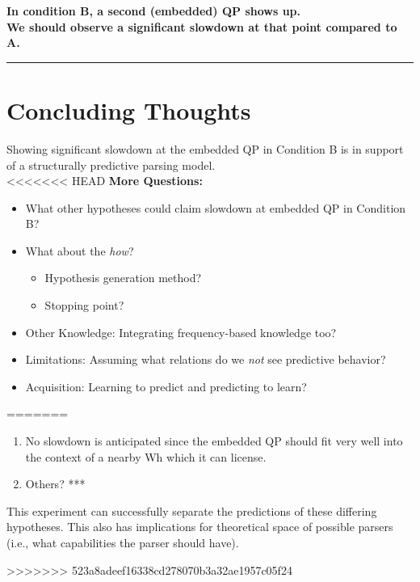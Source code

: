 \documentclass[12pt]{article}
\def\blank{\medskip\hrule\medskip}
\begin{document}

\begin{center}
\textbf{In condition B, a second (embedded) QP shows up. \\ We should observe a significant slowdown at that point compared to A.}
\end{center}


\blank

\section{Concluding Thoughts}
Showing significant slowdown at the embedded QP in Condition B is in support of a structurally predictive parsing
model. \\

<<<<<<< HEAD
\textbf{More Questions:}
\begin{itemize}
    \item What other hypotheses could claim slowdown at embedded QP in Condition B?
    \item What about the \textit{how}?
        \begin{itemize}
            \item Hypothesis generation method?
            \item Stopping point?
        \end{itemize}
    \item Other Knowledge: Integrating frequency-based knowledge too?
    \item Limitations: Assuming what relations do we \textit{not} see predictive behavior?
    \item Acquisition: Learning to predict and predicting to learn?
\end{itemize}

=======
\begin{enumerate}
    \item No slowdown is anticipated since the embedded QP should fit very well into the context of
    a nearby Wh which it can license.
    \item Others? ***
\end{enumerate}

This experiment can successfully separate the predictions of these differing hypotheses.
This also has implications for theoretical space of possible parsers (i.e., what capabilities the parser should have).

>>>>>>> 523a8adeef16338cd278070b3a32ae1957c05f24
\end{document}

